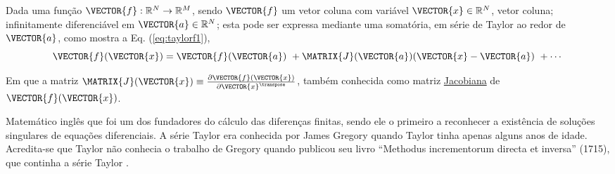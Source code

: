 \begin{proposition}\label{prop:taylorf}
Dada uma função  $\VECTOR{f}:\mathbb{R}^{N}\rightarrow \mathbb{R}^{M}$, 
sendo $\VECTOR{f}$ um vetor coluna com variável $\VECTOR{x} \in \mathbb{R}^{N}$, vetor coluna;
infinitamente diferenciável em $\VECTOR{a} \in \mathbb{R}^{N}$;
esta pode ser expressa mediante uma somatória, em série de Taylor 
\cite[pp. 393]{levine1999control} \cite{Taylor} ao redor de $\VECTOR{a}$, como
mostra a Eq. (\ref{eq:taylorf1}),
\begin{equation}\label{eq:taylorf1}
\VECTOR{f}(\VECTOR{x}) =\VECTOR{f}(\VECTOR{a})
      ~+ \MATRIX{J}(\VECTOR{a}) (\VECTOR{x}-\VECTOR{a})
      ~+\cdots 
\end{equation}

Em que a matriz $\MATRIX{J}(\VECTOR{x})\equiv \frac{\partial \VECTOR{f}(\VECTOR{x})}{\partial \VECTOR{x}^{\transpose} }$,
também conhecida como matriz \hyperref[def:jacobian]{Jacobiana} de $\VECTOR{f}(\VECTOR{x})$.
\end{proposition}


\begin{elaboracion}[title=Brook Taylor (1685-1731), width= 0.99\linewidth]
Matemático inglês que foi um dos fundadores do cálculo das diferenças finitas,
sendo ele o primeiro a reconhecer a existência de soluções singulares de equações diferenciais.
A série Taylor era conhecida por James Gregory quando Taylor tinha apenas alguns anos de idade. 
Acredita-se que Taylor não conhecia o trabalho de Gregory quando publicou seu livro ``Methodus incrementorum directa et inversa'' (1715),
que continha a série Taylor \cite[pp. 198]{agarwal2014creators}.
\end{elaboracion}
